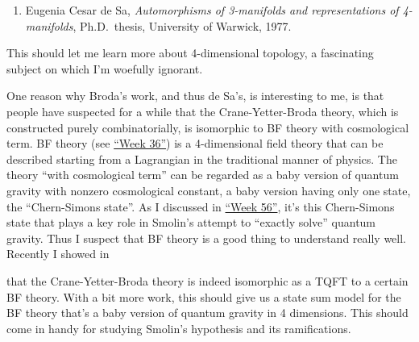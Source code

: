 \documentclass{article}
\def\tightlist{}
\renewcommand{\texttt}[1]{%
  \begingroup
  \ttfamily
  \begingroup\lccode`~=`/\lowercase{\endgroup\def~}{/\discretionary{}{}{}}%
  \begingroup\lccode`~=`[\lowercase{\endgroup\def~}{[\discretionary{}{}{}}%
  \begingroup\lccode`~=`.\lowercase{\endgroup\def~}{.\discretionary{}{}{}}%
  \catcode`/=\active\catcode`[=\active\catcode`.=\active
  \scantokens{#1\noexpand}%
  \endgroup
}
\begin{document}
\begin{enumerate}
\def\labelenumi{\arabic{enumi})}
\setcounter{enumi}{3}
\tightlist
\item
  Eugenia Cesar de Sa, \emph{Automorphisms of 3-manifolds and
  representations of 4-manifolds}, Ph.D.~thesis, University of Warwick,
  1977.
\end{enumerate}

This should let me learn more about 4-dimensional topology, a
fascinating subject on which I'm woefully ignorant.

One reason why Broda's work, and thus de Sa's, is interesting to me, is
that people have suspected for a while that the Crane-Yetter-Broda
theory, which is constructed purely combinatorially, is isomorphic to BF
theory with cosmological term. BF theory (see
\protect\hyperlink{week36}{``Week 36''}) is a 4-dimensional field theory
that can be described starting from a Lagrangian in the traditional
manner of physics. The theory ``with cosmological term'' can be regarded
as a baby version of quantum gravity with nonzero cosmological constant,
a baby version having only one state, the ``Chern-Simons state''. As I
discussed in \protect\hyperlink{week56}{``Week 56''}, it's this
Chern-Simons state that plays a key role in Smolin's attempt to
``exactly solve'' quantum gravity. Thus I suspect that BF theory is a
good thing to understand really well. Recently I showed in


that the Crane-Yetter-Broda theory is indeed isomorphic as a TQFT to a
certain BF theory. With a bit more work, this should give us a state sum
model for the BF theory that's a baby version of quantum gravity in 4
dimensions. This should come in handy for studying Smolin's hypothesis
and its ramifications.

\end{document}
